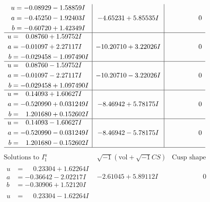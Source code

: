 \documentclass[1p]{elsarticle_modified}
\theoremstyle{definition}
\newcommand{\I}{\sqrt{-1}}
\begin{document}
$$\begin{array}{c|c|c}
\begin{aligned}
u &= -0.08929 - 1.58859 I \\
a &= -0.45250 - 1.92403 I \\
b &= -0.60720 + 1.42349 I\end{aligned}
 & -4.65231 + 5.85535 I & \phantom{-0.000000 } 0 \\ \hline\begin{aligned}
u &= \phantom{-}0.08760 + 1.59752 I \\
a &= -0.01097 + 2.27117 I \\
b &= -0.029458 - 1.097490 I\end{aligned}
 & -10.20710 + 3.22026 I & \phantom{-0.000000 } 0 \\ \hline\begin{aligned}
u &= \phantom{-}0.08760 - 1.59752 I \\
a &= -0.01097 - 2.27117 I \\
b &= -0.029458 + 1.097490 I\end{aligned}
 & -10.20710 - 3.22026 I & \phantom{-0.000000 } 0 \\ \hline\begin{aligned}
u &= \phantom{-}0.14093 + 1.60627 I \\
a &= -0.520990 + 0.031249 I \\
b &= \phantom{-}1.201680 + 0.152602 I\end{aligned}
 & -8.46942 + 5.78175 I & \phantom{-0.000000 } 0 \\ \hline\begin{aligned}
u &= \phantom{-}0.14093 - 1.60627 I \\
a &= -0.520990 - 0.031249 I \\
b &= \phantom{-}1.201680 - 0.152602 I\end{aligned}
 & -8.46942 - 5.78175 I & \phantom{-0.000000 } 0\\
 \hline 
 \end{array}$$\newpage$$\begin{array}{c|c|c}  
\text{Solutions to }I^u_{1}& \I (\text{vol} + \sqrt{-1}CS) & \text{Cusp shape}\\
 \hline 
\begin{aligned}
u &= \phantom{-}0.23304 + 1.62264 I \\
a &= -0.36642 - 2.02217 I \\
b &= -0.30906 + 1.52120 I\end{aligned}
 & -2.61045 + 5.89112 I & \phantom{-0.000000 } 0 \\ \hline\begin{aligned}
u &= \phantom{-}0.23304 - 1.62264 I \\

\end{aligned}
\end{array}$$
\end{document}
